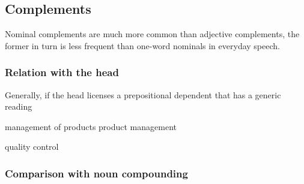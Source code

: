 \documentclass[UTF8, a4paper, oneside, scheme=plain, 12pt]{ctexbook}
\begin{document}
\subsection{Complements}\label{sec:np.nominal.nominal-attributive}

Nominal complements
are much more common than 
adjective complements, 
the former in turn is less frequent than 
one-word nominals in everyday speech.

\subsubsection{Relation with the head}

Generally, if the head licenses a prepositional dependent
that has a generic reading 

\begin{exe}
    \ex \begin{xlist}
        \ex management of products
        \ex product management 
    \end{xlist} 
    \ex quality control 
\end{exe}




\subsubsection{Comparison with noun compounding}\label{sec:np.nominal.nominal-attributive.noun-compound-compare}
\end{document}
